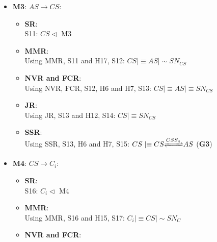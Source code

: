 \documentclass[journal,article,submit,moreauthors,pdftex]{Definitions/mdpi}
\begin{document}
\begin{itemize}
\begin{itemize} [topsep=0pt,itemsep=-1ex,partopsep=1ex,parsep=1ex]
\begin{itemize}[topsep=0pt,itemsep=-1ex,partopsep=1ex,parsep=1ex]
                                     \item \textbf{SSR}:\\
                                     Using SSR, S8, H4 and H5, S10: $AS\mid\equiv CS {\xrightleftharpoons{ASS_1}} AS$ (\textbf{G4})
                                    \end{itemize}
     \item \textbf{M3}: $AS \rightarrow CS$:
                                  \begin{itemize}[topsep=0pt,itemsep=-1ex,partopsep=1ex,parsep=1ex]
                                    \item \textbf{SR}:\\
                                    S11: $CS \lhd$ M3
                                    \item \textbf{MMR}:\\
                                    Using MMR, S11 and H17, S12: $CS \mid\equiv AS \mid \sim SN_{CS}$
                                    \item \textbf{NVR and FCR}:\\
                                     Using NVR, FCR, S12, H6 and H7, S13: $CS \mid\equiv AS \mid\equiv SN_{CS}$
                                     \item \textbf{JR}:\\
                                     Using JR, S13 and H12, S14: $CS \mid\equiv SN_{CS}$
                                     \item \textbf{SSR}:\\
                                     Using SSR, S13, H6 and H7, S15: $CS\mid\equiv CS {\xrightleftharpoons{CSS_4}} AS$ (\textbf{G3})
                                    \end{itemize}
     \item \textbf{M4}: $CS \rightarrow C_{i}$:
                                   \begin{itemize}[topsep=0pt,itemsep=-1ex,partopsep=1ex,parsep=1ex]
                                    \item \textbf{SR}:\\
                                    S16: $C_i \lhd$ M4
                                    \item \textbf{MMR}:\\
                                    Using MMR, S16 and H15, S17: $C_i \mid\equiv CS \mid \sim SN_{C}$
                                    \item \textbf{NVR and FCR}:\\

\end{itemize}
\end{itemize}
\end{itemize}
\end{document}
